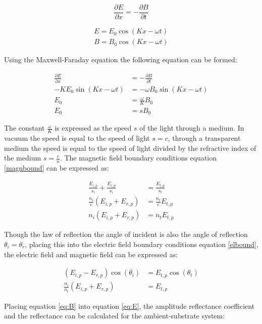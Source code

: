 \documentclass[MasterThesisMain.tex]{subfiles}
\begin{document}
\begin{equation}
\frac{\partial E}{\partial x} = - \frac{\partial B}{\partial t}
\end{equation}

\begin{align}
E = E_0 \cos{(Kx-\omega t)}\\
B = B_0 \cos{(Kx-\omega t)}
\end{align}

Using the Maxwell-Faraday equation the following equation can be formed:

\begin{align}
\frac{\partial E}{\partial x} &= - \frac{\partial B}{\partial t}\\
-K E_0 \sin{(Kx-\omega t)} &= -\omega B_0 \sin{(Kx-\omega t)}\\
E_0 &= \frac{\omega}{K} B_0\\
E_0 &= s B_0
\end{align} 

The constant $\frac{\omega}{K}$ is expressed as the speed $s$ of the light through a medium. In vacuum the speed is equal to the speed of light $s=c$, through a transparent medium the speed is equal to the speed of light divided by the refractive index of the medium $s =\frac{c}{n}$. The magnetic field boundary conditions equation \ref{magnbound} can be expressed as:

\begin{align}
\frac{E_{i,p}}{s_i} + \frac{E_{i,p}}{s_i} &= \frac{E_{t,p}}{s_t}\\
\frac{n_i}{c}(E_{i,p}+E_{r,p}) &= \frac{n_t}{c}E_{t,p}\\
n_i(E_{i,p}+E_{r,p}) &= n_tE_{t,p}
\end{align} 

Though the law of reflection the angle of incident is also the angle of reflection $\theta_i=\theta_r$, placing this into the electric field boundary conditions equation \ref{elbound}, the electric field and magnetic field can be expressed as:

\begin{align}
(E_{i,p}-E_{r,p})\cos(\theta_i) &= E_{t,p}\cos(\theta_t) \label{eq:E}\\
\frac{n_i}{n_t}(E_{i,p}+E_{r,p}) &= E_{t,p} \label{eq:B}
\end{align}

Placing equation \ref{eq:B} into equation \ref{eq:E}, the amplitude reflectance coefficient and the reflectance can be calculated for the ambient-substrate system:
\end{document}
